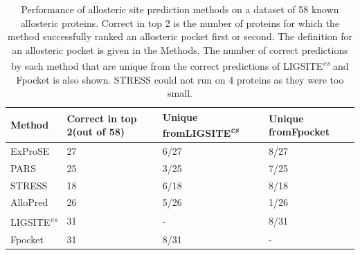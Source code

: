 \begin{table}
\centering

\begin{footnotesize}
\begin{tabular}{ p{3cm} p{3cm} p{3cm} p{3cm} }
\hline
\textbf{Method} & \textbf{Correct in top 2\newline (out of 58)} & \textbf{Unique from\newline LIGSITE\textsuperscript{\it cs}} & \textbf{Unique from\newline Fpocket} \\
\hline
ExProSE                         & 27 & 6/27 & 8/27 \\
PARS                            & 25 & 3/25 & 7/25 \\
STRESS                          & 18 & 6/18 & 8/18 \\
AlloPred                        & 26 & 5/26 & 1/26 \\
LIGSITE\textsuperscript{\it cs} & 31 & -    & 8/31 \\
Fpocket                         & 31 & 8/31 & -    \\
\hline
\end{tabular}
\end{footnotesize}

\caption{Performance of allosteric site prediction methods on a dataset of 58 known allosteric proteins.
Correct in top 2 is the number of proteins for which the method successfully ranked an allosteric pocket first or second.
The definition for an allosteric pocket is given in the Methods.
The number of correct predictions by each method that are unique from the correct predictions of LIGSITE\textsuperscript{\it cs} and Fpocket is also shown.
STRESS could not run on 4 proteins as they were too small.}

\label{tab:allosteric_methods}
\end{table}


